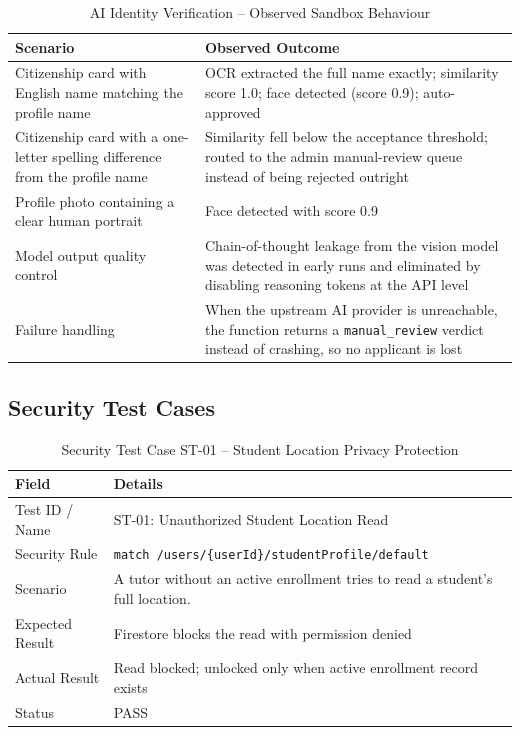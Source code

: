 \documentclass[12pt]{report}
\begin{document}
\begin{table}[H]
\centering
\caption{AI Identity Verification -- Observed Sandbox Behaviour}
\label{tab:ai_eval}
\small
\begin{tabular}{|p{}|p{}|}
\hline
\textbf{Scenario} & \textbf{Observed Outcome} \\
\hline
Citizenship card with English name matching the profile name & OCR extracted the full name exactly; similarity score 1.0; face detected (score 0.9); auto-approved \\
\hline
Citizenship card with a one-letter spelling difference from the profile name & Similarity fell below the acceptance threshold; routed to the admin manual-review queue instead of being rejected outright \\
\hline
Profile photo containing a clear human portrait & Face detected with score 0.9 \\
\hline
Model output quality control & Chain-of-thought leakage from the vision model was detected in early runs and eliminated by disabling reasoning tokens at the API level \\
\hline
Failure handling & When the upstream AI provider is unreachable, the function returns a \texttt{manual\_review} verdict instead of crashing, so no applicant is lost \\
\hline
\end{tabular}
\end{table}

\subsection{Security Test Cases}

\begin{table}[H]
\centering
\caption{Security Test Case ST-01 -- Student Location Privacy Protection}
\label{tab:st01}
\small
\begin{tabular}{|p{3.2cm}|p{11.5cm}|}
\hline
\textbf{Field} & \textbf{Details} \\
\hline
Test ID / Name & ST-01: Unauthorized Student Location Read \\
\hline
Security Rule & \texttt{match /users/\{userId\}/studentProfile/default} \\
\hline
Scenario & A tutor without an active enrollment tries to read a student's full location. \\
\hline
Expected Result & Firestore blocks the read with permission denied \\
\hline
Actual Result & Read blocked; unlocked only when active enrollment record exists \\
\hline
Status & PASS \\
\hline
\end{tabular}
\end{table}
\end{document}
